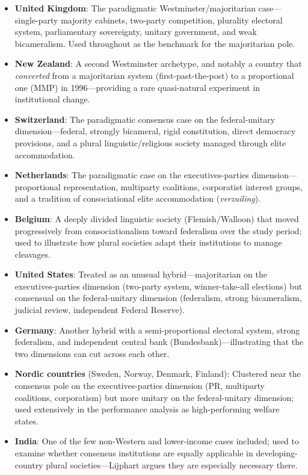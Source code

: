 \documentclass[12pt]{article}
\begin{document}
\begin{itemize}[leftmargin=*, itemsep=4pt]
    \item \textbf{United Kingdom}: The paradigmatic Westminster/majoritarian case---single-party majority cabinets, two-party competition, plurality electoral system, parliamentary sovereignty, unitary government, and weak bicameralism. Used throughout as the benchmark for the majoritarian pole.
    \item \textbf{New Zealand}: A second Westminster archetype, and notably a country that \emph{converted} from a majoritarian system (first-past-the-post) to a proportional one (MMP) in 1996---providing a rare quasi-natural experiment in institutional change.
    \item \textbf{Switzerland}: The paradigmatic consensus case on the federal-unitary dimension---federal, strongly bicameral, rigid constitution, direct democracy provisions, and a plural linguistic/religious society managed through elite accommodation.
    \item \textbf{Netherlands}: The paradigmatic case on the executives-parties dimension---proportional representation, multiparty coalitions, corporatist interest groups, and a tradition of consociational elite accommodation (\textit{verzuiling}).
    \item \textbf{Belgium}: A deeply divided linguistic society (Flemish/Walloon) that moved progressively from consociationalism toward federalism over the study period; used to illustrate how plural societies adapt their institutions to manage cleavages.
    \item \textbf{United States}: Treated as an unusual hybrid---majoritarian on the executives-parties dimension (two-party system, winner-take-all elections) but consensual on the federal-unitary dimension (federalism, strong bicameralism, judicial review, independent Federal Reserve).
    \item \textbf{Germany}: Another hybrid with a semi-proportional electoral system, strong federalism, and independent central bank (Bundesbank)---illustrating that the two dimensions can cut across each other.
    \item \textbf{Nordic countries} (Sweden, Norway, Denmark, Finland): Clustered near the consensus pole on the executives-parties dimension (PR, multiparty coalitions, corporatism) but more unitary on the federal-unitary dimension; used extensively in the performance analysis as high-performing welfare states.
    \item \textbf{India}: One of the few non-Western and lower-income cases included; used to examine whether consensus institutions are equally applicable in developing-country plural societies---Lijphart argues they are especially necessary there.

\end{itemize}
\end{document}
